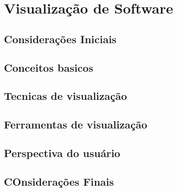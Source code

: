 \chapter{Visualização de Software}
\label{cap-proposta}


\section{Considerações Iniciais}

\section{Conceitos basicos}

\section{Tecnicas de visualização}

\section{Ferramentas de visualização}

\section{Perspectiva do usuário}

\section{COnsiderações Finais}
%
